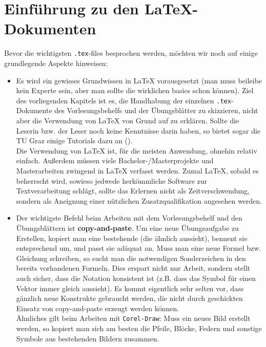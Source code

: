 \chapter{Einf\"{u}hrung zu den \LaTeX-Dokumenten}

Bevor die wichtigsten {\tt .tex}-files besprochen werden, möchten wir noch auf
einige grundlegende Aspekte hinweisen:

\begin{itemize}
  \item Es wird ein gewisses Grundwissen in \LaTeX{} vorausgesetzt (man muss
    beileibe kein Experte sein, aber man sollte die wirklichen basics schon
    können). Ziel des vorliegenden Kapitels ist es, die Handhabung der 
    einzelnen {\tt .tex}-Dokumente des Vorlesungsbehelfs und der Übungsblätter
    zu skizzieren, nicht aber die Verwendung von \LaTeX{} von Grund auf zu 
    erklären. Sollte die Leserin bzw. der Leser noch keine Kenntnisse darin 
    haben, so  bietet sogar die TU Graz einige Tutorials dazu an 
    ({\tt \latextugraz}).\\
    Die Verwendung von \LaTeX{} ist, für die meisten Anwendung, ohnehin relativ
    einfach. Außerdem müssen viele Bachelor-/Masterprojekte und Masterarbeiten
    zwingend in \LaTeX{} verfasst werden. Zumal \LaTeX{}, sobald es beherrscht
    wird, sowieso jedwede herkömmliche Software zur Textverarbeitung schlägt,
    sollte das Erlernen nicht als Zeitverschwendung, sondern als Aneignung einer
    nützlichen Zusatzqualifikation angesehen werden.
  \item Der wichtigste Befehl beim Arbeiten mit dem Vorlesungsbehelf und
    den Übungsblättern ist {\bf copy-and-paste}. Um eine neue Übungsaufgabe zu
    Erstellen, kopiert man eine bestehende (die ähnlich aussieht), bennent sie
    entsprechend um, und passt sie adäquat an. Muss man eine neue Formel
    bzw. Gleichung schreiben, so sucht man die notwendigen Sonderzeichen in den
    bereits vorhandenen Formeln. Dies erspart nicht nur Arbeit, sondern stellt
    auch sicher, dass die Notation konsistent ist (z.B. dass das Symbol für 
    einen Vektor immer gleich aussieht). Es kommt eigentlich sehr selten vor, 
    dass gänzlich neue Konstrukte gebraucht werden, die nicht durch geschickten
    Einsatz von copy-and-paste erzeugt werden können.\\
    Ähnliches gilt beim Arbeiten mit {\tt Corel-Draw}: Muss ein neues Bild
    erstellt werden, so kopiert man sich am besten die Pfeile, Blöcke, Federn
    und sonstige Symbole aus bestehenden Bildern zusammen.
\end{itemize}

